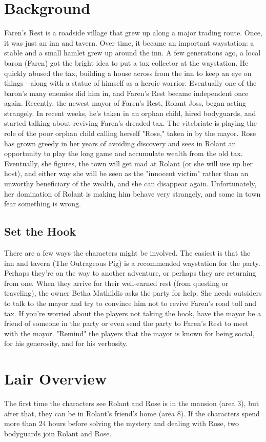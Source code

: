 \documentclass[10pt,a4paper,twoside,twocolumn,openany,bg=print,nodeprecatedcode]{dndbook}
\begin{document}
\section{Background}
Faren's Rest is a roadside village that grew up along a major trading route. Once, it was just an inn and tavern. Over time, it became an important waystation: a stable and a small hamlet grew up around the inn. A few generations ago, a local baron (Faren) got the bright idea to put a tax collector at the waystation. He quickly abused the tax, building a house across from the inn to keep an eye on things—along with a statue of himself as a heroic warrior. Eventually one of the baron's many enemies did him in, and Faren's Rest became independent once again.
Recently, the newest mayor of Faren's Rest, Rolant Joss, began acting strangely. In recent weeks, he's taken in an orphan child, hired bodyguards, and started talking about reviving Faren's dreaded tax.
The vitebriate is playing the role of the poor orphan child calling herself "Rose," taken in by the mayor. Rose has grown greedy in her years of avoiding discovery and sees in Rolant an opportunity to play the long game and accumulate wealth from the old tax. Eventually, she figures, the town will get mad at Rolant (or she will use up her host), and either way she will be seen as the "innocent victim" rather than an unworthy beneficiary of the wealth, and she can disappear again. Unfortunately, her domination of Rolant is making him behave very strangely, and some in town fear something is wrong.
\subsection{Set the Hook}
There are a few ways the characters might be involved. The easiest is that the inn and tavern (The Outrageous Pig) is a recommended waystation for the party. Perhaps they're on the way to another adventure, or perhaps they are returning from one. When they arrive for their well-earned rest (from questing or traveling), the owner Betha Mathildis asks the party for help. She needs outsiders to talk to the mayor and try to convince him not to revive Faren's road toll and tax.
If you're worried about the players not taking the hook, have the mayor be a friend of someone in the party or even send the party to Faren's Rest to meet with the mayor. "Remind" the players that the mayor is known for being social, for his generosity, and for his verbosity.
\section{Lair Overview}
The first time the characters see Rolant and Rose is in the mansion (area 3), but after that, they can be in Rolant's friend's home (area 8). If the characters spend more than 24 hours before solving the mystery and dealing with Rose, two bodyguards join Rolant and Rose.
\end{document}
